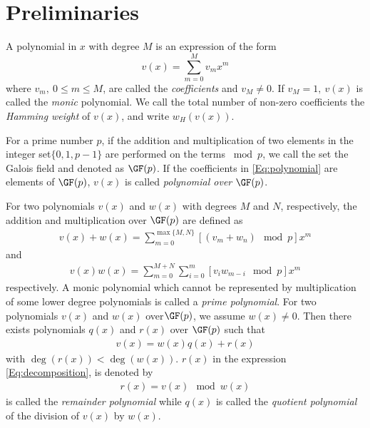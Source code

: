 \section{Preliminaries}
\label{secPrelim}

A polynomial in $x$ with degree $M$ is an expression of the form
\begin{equation}
v(x) = \sum_{m=0}^{M} v_mx^m
\label{Eq:polynomial}
\end{equation}
where $v_m,~0 \leq m \leq M$, are called the \textit{coefficients} and $v_M \neq 0$. If $v_M=1,~v(x)$ is called the \textit{monic} polynomial. We call the total number of non-zero coefficients the \textit{Hamming weight} of $v(x)$, and write $w_H(v(x))$.


For a prime number $p$, if the addition and multiplication of two elements in the integer set$\{ 0,1,p-1\}$ are performed on the terms $\bmod p$, we call the set the Galois field and denoted as $\GF(p)$. If the coefficients in \eqref{Eq:polynomial} are elements of $\GF(p)$, $v(x)$ is called {\it polynomial over} $\GF(p)$.


For two polynomials $v(x)$ and $w(x)$ with degrees $M$ and $N$, respectively, the addition and multiplication over $\GF(p)$ are defined as 
\begin{align}
v(x)+w(x)=\sum_{m=0}^{\max\{ M,N\}} [(v_m +w_n)\mod p] x^m
\label{Eq:addition}
\end{align}
and
\begin{align}
v(x)w(x)=\sum_{m=0}^{ M+N} \sum_{i=0}^{m} [v_i w_{m-i}\mod p]x^m
\label{Eq:multiplication}
\end{align}
respectively. 
A monic polynomial which cannot be represented by multiplication of some lower degree polynomials is called a \textit{prime polynomial}.
For two polynomials $v(x)$ and $w(x)$ over$\GF(p)$, we assume $w(x) \neq 0$. Then there exists polynomials $q(x)$ and $r(x)$ over $\GF(p)$ such that 
\begin{align}
v(x) = w(x)q(x)+r(x)
\label{Eq:decomposition}
\end{align}
with $\deg(r(x)) < \deg(w(x))$. $r(x)$ in the expression \eqref{Eq:decomposition}, is denoted by
\begin{align}
r(x) =v(x)\mod w(x)
\end{align}
is called the \textit{remainder polynomial} while $q(x)$ is called the \textit{quotient polynomial} of the division of $v(x)$ by $w(x)$.

